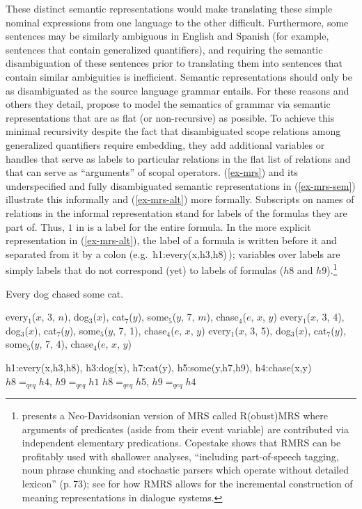 \documentclass[output=paper
	        ,collection
	        ,collectionchapter
 	        ,biblatex
                ,babelshorthands
                ,newtxmath
                ,draftmode
                ,colorlinks, citecolor=brown
]{langscibook}
\begin{document}
These distinct semantic representations would make translating these simple nominal expressions from one language to the other difficult. Furthermore, some sentences may be similarly ambiguous in English and Spanish (for example, sentences that contain generalized quantifiers), and requiring the semantic disambiguation of these sentences prior to translating them into sentences that contain similar ambiguities is inefficient. Semantic representations should only be as disambiguated as the source language grammar entails. For these reasons and others they detail, \citet{Copestakeetal1995} propose to model the semantics of grammar via semantic representations that are as flat (or non-recursive) as possible. To achieve this minimal recursivity despite the fact that disambiguated scope relations among generalized quantifiers require embedding, they add additional variables or handles that serve as labels to particular relations in the flat list of relations and that can serve as ``arguments'' of scopal operators. (\ref{ex-mrs}) and its underspecified and fully disambiguated semantic representations in (\ref{ex-mrs-sem}) illustrate this informally and (\ref{ex-mrs-alt}) more formally. Subscripts on names of relations in the informal representation stand for labels of the formulas they are part of. Thus, $1$ in  is a label for the entire formula. In the more explicit representation in (\ref{ex-mrs-alt}), the label of a formula is written before it and separated from it by a colon (e.g.\ h1:every(x,h3,h8)\,); 
variables over labels are simply labels that do not correspond (yet) to labels of formulas ($h8$ and $h9$).\footnote{\citet{Copestake2007} presents a Neo-Davidsonian version of MRS called R(obust)MRS where arguments of predicates (aside from their event variable) are contributed via independent elementary predications. Copestake shows that RMRS can be profitably used with shallower analyses, ``including part-of-speech tagging, noun phrase chunking and stochastic parsers which operate without detailed lexicon'' (p.\,73); see \citet{PeldzusandSchlangen2012} for how RMRS allows for the incremental construction of meaning representations in dialogue systems.}

\begin{exe}
\ex\label{ex-mrs}
Every dog chased some cat.
\ex\label{ex-mrs-sem}
\begin{xlist}
\ex\label{ex-mrs-sem-a}
every$_{1}$($x$, 3, $n$), dog$_{3}$($x$), cat$_{7}$($y$), some$_{5}$($y$, 7, $m$), chase$_{4}$($e$, $x$, $y$)
\ex\label{ex-mrs-sem-b}
every$_{1}$($x$, 3, 4), dog$_{3}$($x$), cat$_{7}$($y$), some$_{5}$($y$, 7, 1), chase$_{4}$($e$, $x$, $y$)
\ex\label{ex-mrs-sem-c}
every$_{1}$($x$, 3, 5), dog$_{3}$($x$), cat$_{7}$($y$), some$_{5}$($y$, 7, 4), chase$_{4}$($e$, $x$, $y$)
\end{xlist}
\ex\label{ex-mrs-alt}
\begin{xlist}
\ex\label{ex-mrs-alt-a}
h1:every(x,h3,h8), h3:dog(x), h7:cat(y), h5:some(y,h7,h9), h4:chase(x,y)
\ex\label{ex-mrs-alt-b}
$h8=_{qeq}h4$, $h9=_{qeq}h1$
\ex\label{ex-mrs-alt-c}
$h8=_{qeq}h5$, $h9=_{qeq}h4$
\end{xlist}
\end{exe} 
\end{document}
